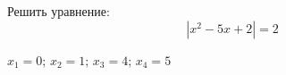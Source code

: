 \begin{ex}
	Решить уравнение:
	$$ |x^2-5x+2|=2 $$
	\begin{answer}
		$x_1=0$; $x_2=1$; $x_3=4$; $x_4=5$
	\end{answer}
\end{ex}